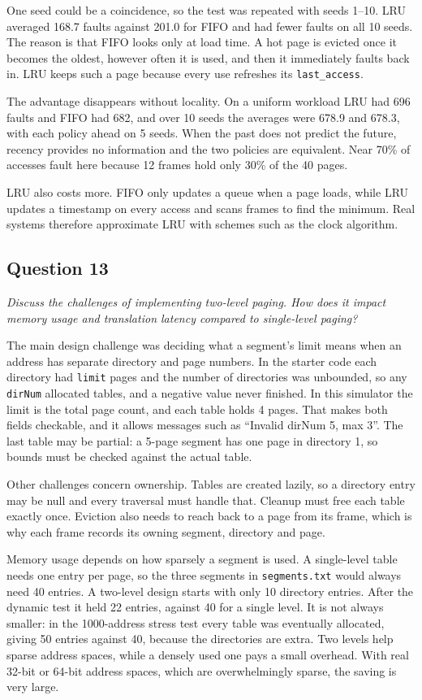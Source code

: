 \documentclass[11pt]{article}
\newcommand{\question}[2]{\subsection*{Question #1}\noindent\textit{#2}\par\medskip}
\newcommand{\code}[1]{\texttt{#1}}
\begin{document}
One seed could be a coincidence, so the test was repeated with seeds 1--10. LRU
averaged 168.7 faults against 201.0 for FIFO and had fewer faults on all 10 seeds.
The reason is that FIFO looks only at load time. A hot page is evicted once it
becomes the oldest, however often it is used, and then it immediately faults back
in. LRU keeps such a page because every use refreshes its \code{last\_access}.

The advantage disappears without locality. On a uniform workload LRU had 696
faults and FIFO had 682, and over 10 seeds the averages were 678.9 and 678.3, with
each policy ahead on 5 seeds. When the past does not predict the future, recency
provides no information and the two policies are equivalent. Near 70\% of accesses
fault here because 12 frames hold only 30\% of the 40 pages.

LRU also costs more. FIFO only updates a queue when a page loads, while LRU
updates a timestamp on every access and scans frames to find the minimum. Real
systems therefore approximate LRU with schemes such as the clock algorithm.

\question{13}{Discuss the challenges of implementing two-level paging. How does it impact memory usage and translation latency compared to single-level paging?}
The main design challenge was deciding what a segment's limit means when an
address has separate directory and page numbers. In the starter code each
directory had \code{limit} pages and the number of directories was unbounded, so
any \code{dirNum} allocated tables, and a negative value never finished. In this
simulator the limit is the total page count, and each table holds 4 pages. That
makes both fields checkable, and it allows messages such as ``Invalid dirNum 5,
max 3''. The last table may be partial: a 5-page segment has one page in
directory 1, so bounds must be checked against the actual table.

Other challenges concern ownership. Tables are created lazily, so a directory
entry may be null and every traversal must handle that. Cleanup must free each
table exactly once. Eviction also needs to reach back to a page from its frame,
which is why each frame records its owning segment, directory and page.

Memory usage depends on how sparsely a segment is used. A single-level table needs
one entry per page, so the three segments in \code{segments.txt} would always
need 40 entries. A two-level design starts with only 10 directory entries. After
the dynamic test it held 22 entries, against 40 for a single level. It is not
always smaller: in the 1000-address stress test every table was eventually
allocated, giving 50 entries against 40, because the directories are extra. Two
levels help sparse address spaces, while a densely used one pays a small overhead.
With real 32-bit or 64-bit address spaces, which are overwhelmingly sparse, the
saving is very large.
\end{document}
